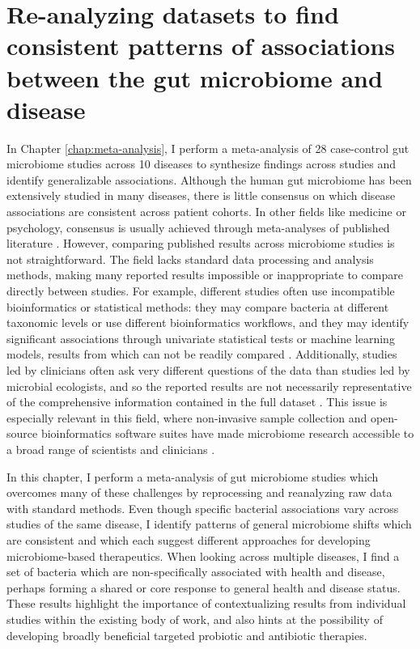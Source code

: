 \section{Re-analyzing datasets to find consistent patterns of associations between the gut microbiome and disease}

In Chapter \ref{chap:meta-analysis}, I perform a meta-analysis of 28 case-control gut microbiome studies across 10 diseases to synthesize findings across studies and identify generalizable associations.
Although the human gut microbiome has been extensively studied in many diseases, there is little consensus on which disease associations are consistent across patient cohorts.
In other fields like medicine or psychology, consensus is usually achieved through meta-analyses of published literature \cite{glass-1976}.
However, comparing published results across microbiome studies is not straightforward.
The field lacks standard data processing and analysis methods, making many reported results impossible or inappropriate to compare directly between studies.
For example, different studies often use incompatible bioinformatics or statistical methods: they may compare bacteria at different taxonomic levels or use different bioinformatics workflows, and they may identify significant associations through univariate statistical tests or machine learning models, results from which can not be readily compared \cite{edd-singh,crc-baxter,crc-zeller,ob-zupancic}.
Additionally, studies led by clinicians often ask very different questions of the data than studies led by microbial ecologists, and so the reported results are not necessarily representative of the comprehensive information contained in the full dataset \cite{asd-son,ra-scher,nash-wong}.
This issue is especially relevant in this field, where non-invasive sample collection and open-source bioinformatics software suites have made microbiome research accessible to a broad range of scientists and clinicians \cite{qiime2}.

In this chapter, I perform a meta-analysis of gut microbiome studies which overcomes many of these challenges by reprocessing and reanalyzing raw data with standard methods.
Even though specific bacterial associations vary across studies of the same disease, I identify patterns of general microbiome shifts which are consistent  and which each suggest different approaches for developing microbiome-based therapeutics.
When looking across multiple diseases, I find a set of bacteria which are non-specifically associated with health and disease, perhaps forming a shared or core response to general health and disease status.
These results highlight the importance of contextualizing results from individual studies within the existing body of work, and also hints at the possibility of developing broadly beneficial targeted probiotic and antibiotic therapies.

